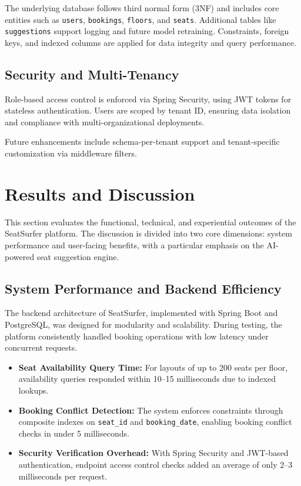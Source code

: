 \documentclass[conference]{IEEEtran}
\begin{document}
The underlying database follows third normal form (3NF) and includes core entities such as \texttt{users}, \texttt{bookings}, \texttt{floors}, and \texttt{seats}. Additional tables like \texttt{suggestions} support logging and future model retraining. Constraints, foreign keys, and indexed columns are applied for data integrity and query performance.

\subsection{Security and Multi-Tenancy}

Role-based access control is enforced via Spring Security, using JWT tokens for stateless authentication. Users are scoped by tenant ID, ensuring data isolation and compliance with multi-organizational deployments.

Future enhancements include schema-per-tenant support and tenant-specific customization via middleware filters.

\section{Results and Discussion}

This section evaluates the functional, technical, and experiential outcomes of the SeatSurfer platform. The discussion is divided into two core dimensions: system performance and user-facing benefits, with a particular emphasis on the AI-powered seat suggestion engine.

\subsection{System Performance and Backend Efficiency}

The backend architecture of SeatSurfer, implemented with Spring Boot and PostgreSQL, was designed for modularity and scalability. During testing, the platform consistently handled booking operations with low latency under concurrent requests.

\begin{itemize}
    \item \textbf{Seat Availability Query Time:} For layouts of up to 200 seats per floor, availability queries responded within 10--15 milliseconds due to indexed lookups.
    \item \textbf{Booking Conflict Detection:} The system enforces constraints through composite indexes on \texttt{seat\_id} and \texttt{booking\_date}, enabling booking conflict checks in under 5 milliseconds.
    \item \textbf{Security Verification Overhead:} With Spring Security and JWT-based authentication, endpoint access control checks added an average of only 2--3 milliseconds per request.
\end{itemize}
\end{document}
